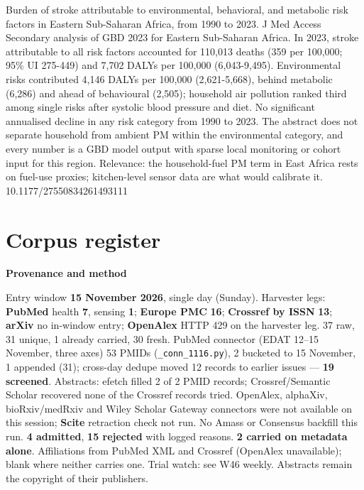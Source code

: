 \documentclass[10pt]{article}
\begin{document}
{Burden of stroke attributable to environmental, behavioral, and metabolic risk factors in Eastern Sub-Saharan Africa, from 1990 to 2023.}
{J Med Access}
{Secondary analysis of GBD 2023 for Eastern Sub-Saharan Africa. In 2023, stroke attributable to all risk factors accounted for 110,013 deaths (359 per 100,000; 95\% UI 275-449) and 7,702 DALYs per 100,000 (6,043-9,495). Environmental risks contributed 4,146 DALYs per 100,000 (2,621-5,668), behind metabolic (6,286) and ahead of behavioural (2,505); household air pollution ranked third among single risks after systolic blood pressure and diet. No significant annualised decline in any risk category from 1990 to 2023. The abstract does not separate household from ambient PM within the environmental category, and every number is a GBD model output with sparse local monitoring or cohort input for this region. Relevance: the household-fuel PM term in East Africa rests on fuel-use proxies; kitchen-level sensor data are what would calibrate it.}
{10.1177/27550834261493111}

\clearpage
\section*{\sffamily\bfseries\color{Deep}Corpus register}
\vspace{-1.5mm}{\color{Amber}\rule{\linewidth}{1.1pt}}\vspace{2.5mm}



\vspace{2mm}

\begin{keybox}
{\sffamily\bfseries\footnotesize\color{Deep}Provenance and method}\\[1.2mm]
{\fontsize{7.2}{8.8}\selectfont
Entry window \textbf{15 November 2026}, single day (Sunday). Harvester legs: \textbf{PubMed} health \textbf{7}, sensing \textbf{1}; \textbf{Europe PMC} \textbf{16}; \textbf{Crossref by ISSN} \textbf{13}; \textbf{arXiv} no in-window entry; \textbf{OpenAlex} HTTP 429 on the harvester leg. 37 raw, 31 unique, 1 already carried, 30 fresh. PubMed connector (EDAT 12--15 November, three axes) 53 PMIDs (\texttt{\_conn\_1116.py}), 2 bucketed to 15 November, 1 appended (31); cross-day dedupe moved 12 records to earlier issues --- \textbf{19 screened}. Abstracts: efetch filled 2 of 2 PMID records; Crossref/Semantic Scholar recovered none of the Crossref records tried.
OpenAlex, alphaXiv, bioRxiv/medRxiv and Wiley Scholar Gateway connectors were not available on this session; \textbf{Scite} retraction check not run. No Amass or Consensus backfill this run.
\textbf{4 admitted}, \textbf{15 rejected} with logged reasons. \textbf{2 carried on metadata alone}. Affiliations from PubMed XML and Crossref (OpenAlex unavailable); blank where neither carries one. Trial watch: see W46 weekly.
Abstracts remain the copyright of their publishers.\par}
\end{keybox}
\end{document}
